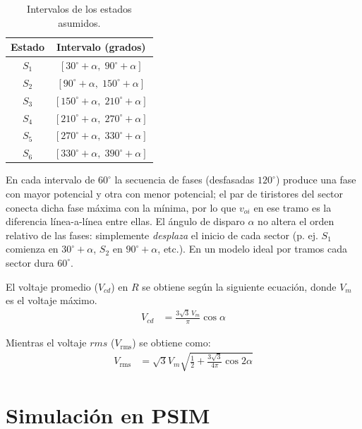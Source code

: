\documentclass[conference]{IEEEtran}
\begin{document}

\begin{table}[h!]
	\centering
	\small
	\begin{tabular}{@{}cc@{}}
		\toprule
		Estado & Intervalo (grados) \\ \midrule
	    $S_{1}$ & $[30^\circ+\alpha,\;90^\circ+\alpha]$ \\
		$S_{2}$ & $[90^\circ+\alpha,\;150^\circ+\alpha]$ \\
		$S_{3}$ & $[150^\circ+\alpha,\;210^\circ+\alpha]$ \\
		$S_{4}$ & $[210^\circ+\alpha,\;270^\circ+\alpha]$ \\
		$S_{5}$ & $[270^\circ+\alpha,\;330^\circ+\alpha]$ \\
		$S_{6}$ & $[330^\circ+\alpha,\;390^\circ+\alpha]$ \\ \bottomrule
	\end{tabular}
	\caption{Intervalos de los estados asumidos.}
	
	\label{tab:estados_grados}
\end{table}

En cada intervalo de $60^\circ$ la secuencia de fases (desfasadas $120^\circ$) produce una fase 
con mayor potencial y otra con menor potencial; el par de tiristores del sector conecta dicha fase 
máxima con la mínima, por lo que $v_{oi}$ en ese tramo es la diferencia línea-a-línea entre ellas. 
El ángulo de disparo $\alpha$ no altera el orden relativo de las fases: simplemente \emph{desplaza} el inicio de cada sector (p. ej. $S_{1}$ comienza en $30^\circ+\alpha$, 
$S_{2}$ en $90^\circ+\alpha$, etc.). En un modelo ideal por tramos cada sector dura $60^\circ$.

El voltaje promedio ($V_{cd}$) en $R$ se obtiene según la siguiente ecuación, donde $V_m$ es el voltaje máximo.
\begin{align*}	
    V_{cd} &= \frac{3\sqrt{3}\,V_m}{\pi} \cos\alpha	
\end{align*}

Mientras el voltaje $rms$ ($V_{\text{rms}}$) se obtiene como:
\begin{align*}	
    V_{\text{rms}} &= \sqrt{3}V_m\sqrt{\frac{1}{2} + \frac{3\sqrt{3}}{4\pi} \cos 2\alpha}
\end{align*}


\section{Simulación en PSIM}
\end{document}
